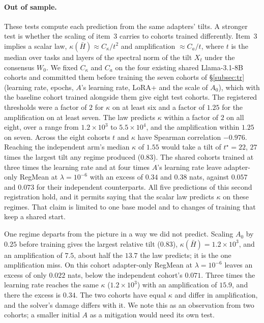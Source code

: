 \paragraph{Out of sample.} These tests compute each prediction from the same
adapters' tilts. A stronger test is whether the scaling of item~3 carries to
cohorts trained differently. Item~3 implies a scalar law,
$\kappa(\bar H) \approx C_\kappa / t^2$ and amplification $\approx C_a / t$,
where $t$ is the median over tasks and layers of the spectral norm of the tilt
$X_t$ under the consensus $W_0$. We fixed $C_\kappa$ and $C_a$ on the four
existing shared Llama-3.1-8B cohorts and committed them before training the
seven cohorts of \S\ref{subsec:tr} (learning rate, epochs, $A$'s learning
rate, LoRA+ and the scale of $A_0$), which with the baseline cohort trained
alongside them give eight test cohorts. The registered thresholds were a
factor of $2$ for $\kappa$ on at least six and a factor of $1.25$ for the
amplification on at least seven. The law predicts $\kappa$ within a factor of
$2$ on all eight, over a range from $1.2\times10^{3}$ to $5.5\times10^{4}$,
and the amplification within $1.25$ on seven. Across the eight cohorts $t$ and
$\kappa$ have Spearman correlation $-0.976$. Reaching the independent arm's
median $\kappa$ of $1.55$ would take a tilt of $t^\star = 22$, $27$ times the
largest tilt any regime produced ($0.83$). The shared cohorts trained at three
times the learning rate and at four times $A$'s learning rate leave
adapter-only RegMean at $\lambda = 10^{-6}$ with an excess of $0.34$ and
$0.38$ nats, against $0.057$ and $0.073$ for their independent counterparts.
All five predictions of this second registration hold, and it permits saying
that the scalar law predicts $\kappa$ on these regimes. That claim is limited
to one base model and to changes of training that keep a shared start.

One regime departs from the picture in a way we did not predict. Scaling
$A_0$ by $0.25$ before training gives the largest relative tilt ($0.83$),
$\kappa(\bar H) = 1.2\times10^{3}$, and an amplification of $7.5$, about half
the $13.7$ the law predicts; it is the one amplification miss. On this cohort
adapter-only RegMean at $\lambda = 10^{-6}$ leaves an excess of only $0.022$
nats, below the independent cohort's $0.071$. Three times the learning rate
reaches the same $\kappa$ ($1.2\times10^{3}$) with an amplification of
$15.9$, and there the excess is $0.34$. The two cohorts have equal $\kappa$
and differ in amplification, and the solver's damage differs with it. We note
this as an observation from two cohorts; a smaller initial $A$ as a mitigation
would need its own test.

